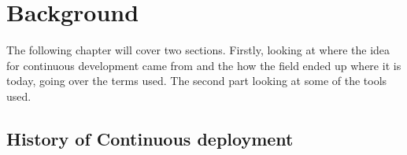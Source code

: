 %
%
%
%
%
%

\section{Background}

The following chapter will cover two sections. Firstly, looking at where the idea for continuous development came from and the how the field ended up where it is today, going over the terms used. The second part looking at some of the tools used.

\subsection{History of Continuous deployment}

